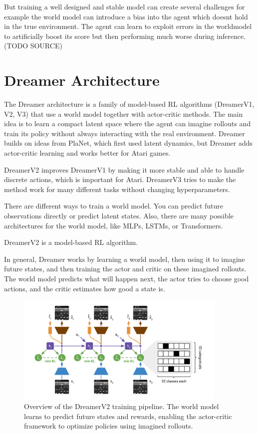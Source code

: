 \documentclass[
	english,
	ruledheaders=section,
	class=report,
	thesis={type=master},
	accentcolor=9c,
	custommargins=true,
	marginpar=false,
	parskip=half-,
	fontsize=11pt,
]{tudapub}
\begin{document}
But training a well designed and stable model can create several challenges for
example the world model can introduce a bias into the agent which doesnt hold
in the true environment. The agent can learn to exploit errors in the
worldmodel to artificially boost its score but then performing much worse
during inference. (TODO SOURCE)

\section{Dreamer Architecture}
\label{sec:dreamer_architecture}

The Dreamer architecture is a family of model-based RL algorithms (DreamerV1,
V2, V3) that use a world model together with actor-critic methods. The main
idea is to learn a compact latent space where the agent can imagine rollouts
and train its policy without always interacting with the real environment.
Dreamer builds on ideas from PlaNet, which first used latent dynamics, but
Dreamer adds actor-critic learning and works better for Atari games.

DreamerV2 improves DreamerV1 by making it more stable and able to handle
discrete actions, which is important for Atari. DreamerV3 tries to make the
method work for many different tasks without changing hyperparameters.

There are different ways to train a world model. You can predict future
observations directly or predict latent states. Also, there are many possible
architectures for the world model, like MLPs, LSTMs, or Transformers.

DreamerV2 \cite{hafner2019dreamer} is a model-based RL algorithm.

In general, Dreamer works by learning a world model, then using it to imagine
future states, and then training the actor and critic on these imagined
rollouts. The world model predicts what will happen next, the actor tries to
choose good actions, and the critic estimates how good a state is.

\begin{figure}[ht]
	\centering
	\includegraphics[width=0.9\textwidth]{images/DreamerFlow.png}
	\caption{Overview of the DreamerV2 training pipeline. The world model learns to predict future states and rewards, enabling the actor-critic framework to optimize policies using imagined rollouts.}
	\label{fig:dreamer_flow}
\end{figure}
\end{document}
